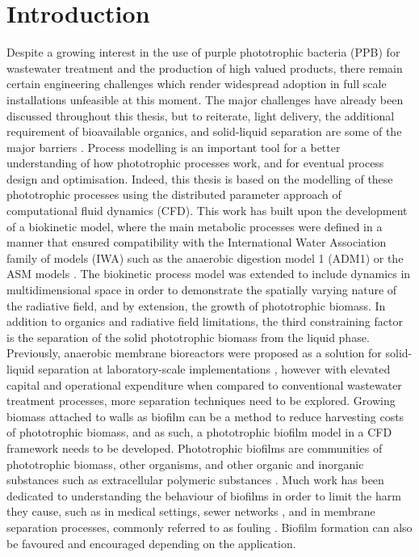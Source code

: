 \section{Introduction}
Despite a growing interest in the use of purple phototrophic bacteria (PPB) for wastewater treatment and the production of high valued products, there remain certain engineering challenges which render widespread adoption in full scale installations unfeasible at this moment.
The major challenges have already been discussed throughout this thesis, but to reiterate, light delivery, the additional requirement of bioavailable organics, and solid-liquid separation are some of the major barriers \cite{Hulsen201}. 
Process modelling is an important tool for a better understanding of how phototrophic processes work, and for eventual process design and optimisation. 
Indeed, this thesis is based on the modelling of these phototrophic processes using the distributed parameter approach of computational fluid dynamics (CFD). 
This work has built upon the development of a biokinetic model, where the main metabolic processes were defined in a manner that ensured compatibility with the International Water Association family of models (IWA) such as the anaerobic digestion model 1 (ADM1) \cite{Batstone2002} or the ASM models \cite{Henze2000}. 
The biokinetic process model was extended to include dynamics in multidimensional space in order to demonstrate the spatially varying nature of the radiative field, and by extension, the growth of phototrophic biomass. 
In addition to organics and radiative field limitations, the third constraining factor is the separation of the solid phototrophic biomass from the liquid phase. 
Previously, anaerobic membrane bioreactors were proposed as a solution for solid-liquid separation at laboratory-scale implementations \cite{Hulsen2016}, however with elevated capital and operational expenditure when compared to conventional wastewater treatment processes, more separation techniques need to be explored. 
Growing biomass attached to walls as biofilm can be a method to reduce harvesting costs of phototrophic biomass, and as such, a phototrophic biofilm model in a CFD framework needs to be developed. 
\skippingparagraph
Phototrophic biofilms are communities of phototrophic biomass, other organisms, and other organic and inorganic substances such as extracellular polymeric substances \cite{VanLoosdrecht2002}. 
Much work has been dedicated to understanding the behaviour of biofilms in order to limit the harm they cause, such as in medical settings, sewer networks \cite{Pikaar2014}, and in membrane separation processes, commonly referred to as fouling \cite{Radaei2018}. Biofilm formation can also be favoured and encouraged depending on the application. 

